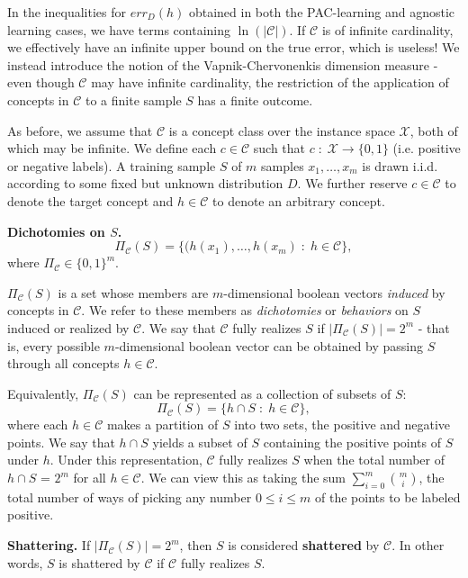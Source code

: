 \documentclass{article}
\begin{document}
In the inequalities for $err_D(h)$ obtained in both the PAC-learning and
agnostic learning cases, we have terms containing $\ln(|\mathcal{C}|)$. If
$\mathcal{C}$ is of infinite cardinality, we effectively have an infinite upper
bound on the true error, which is useless! We instead introduce the notion of
the Vapnik-Chervonenkis dimension measure - even though $\mathcal{C}$ may have
infinite cardinality, the restriction of the application of concepts in
$\mathcal{C}$ to a finite sample $S$ has a finite outcome.

As before, we assume that $\mathcal{C}$ is a concept class over the instance
space $\mathcal{X}$, both of which may be infinite. We define each
$c \in \mathcal{C}$ such that $c\;:\;\mathcal{X} \rightarrow \{0,1\}$
(i.e. positive or negative labels). A training sample $S$ of $m$ samples $x_1,
\dots, x_m$ is drawn i.i.d. according to some fixed but unknown distribution $D$.
We further reserve $c \in \mathcal{C}$ to denote the target concept and
$h \in \mathcal{C}$ to denote an arbitrary concept.

\textbf{Dichotomies on $S$.}
$$\Pi_\mathcal{C}(S) = \{(h(x_1),\dots,h(x_m)\;:\;h\in \mathcal{C}\},$$
    where $\Pi_\mathcal{C} \in \{0,1\}^m$.

$\Pi_\mathcal{C}(S)$ is a set whose members are $m$-dimensional boolean vectors
\emph{induced} by concepts in $\mathcal{C}$. We refer to these members as
\emph{dichotomies} or \emph{behaviors} on $S$ induced or realized by
$\mathcal{C}$. We say that $\mathcal{C}$ fully realizes $S$ if
$|\Pi_\mathcal{C}(S)| = 2^m$ - that is, every possible $m$-dimensional boolean
vector can be obtained by passing $S$ through all concepts $h \in \mathcal{C}$.

Equivalently, $\Pi_\mathcal{C}(S)$ can be represented as a collection of subsets
of $S$: $$\Pi_\mathcal{C}(S) = \{h \cap S\;:\;h\in \mathcal{C}\},$$ where each
$h\in\mathcal{C}$ makes a partition of $S$ into two sets, the positive and
negative points. We say that $h \cap S$ yields a subset of $S$ containing the
positive points of $S$ under $h$. Under this representation, $\mathcal{C}$ fully
realizes $S$ when the total number of $h \cap S$ = $2^m$ for all
$h \in \mathcal{C}$. We can view this as taking the sum
$\sum_{i=0}^m \binom{m}{i}$, the total number of ways of picking any number
$0 \leq i \leq m$ of the points to be labeled positive.

\textbf{Shattering.} If $|\Pi_\mathcal{C}(S)| = 2^m$, then $S$ is considered
\textbf{shattered} by $\mathcal{C}$. In other words, $S$ is shattered by
$\mathcal{C}$ if $\mathcal{C}$ fully realizes $S$.
\end{document}
